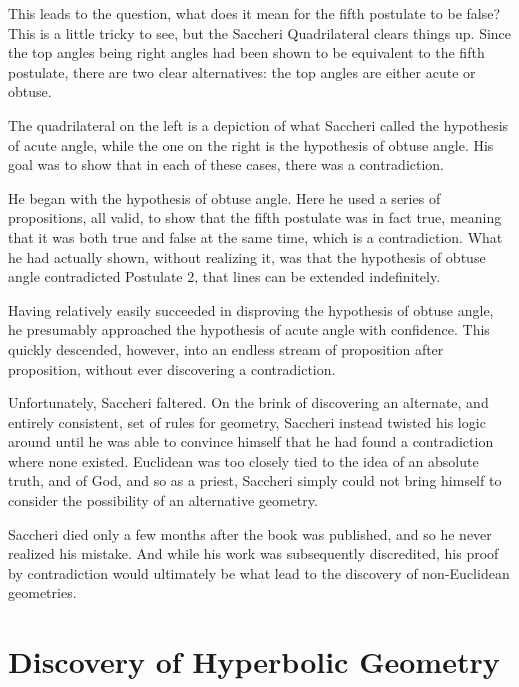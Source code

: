 \documentclass[12pt]{article}
\begin{document}
This leads to the question, what does it mean for the fifth postulate to be false? This is a little tricky to see, but the Saccheri Quadrilateral clears things up. Since the top angles being right angles had been shown to be equivalent to the fifth postulate, there are two clear alternatives: the top angles are either acute or obtuse.

\begin{quads}[scale=.75]
\saccheriquad[type=acute, shift=-4]
\saccheriquad[type=obtuse, shift=4]
\end{quads}

The quadrilateral on the left is a depiction of what Saccheri called the hypothesis of acute angle, while the one on the right is the hypothesis of obtuse angle. His goal was to show that in each of these cases, there was a contradiction.

He began with the hypothesis of obtuse angle. Here he used a series of propositions, all valid, to show that the fifth postulate was in fact true, meaning that it was both true and false at the same time, which is a contradiction. What he had actually shown, without realizing it, was that the hypothesis of obtuse angle contradicted Postulate 2, that lines can be extended indefinitely.

Having relatively easily succeeded in disproving the hypothesis of obtuse angle, he presumably approached the hypothesis of acute angle with confidence. This quickly descended, however, into an endless stream of proposition after proposition, without ever discovering a contradiction.

Unfortunately, Saccheri faltered. On the brink of discovering an alternate, and entirely consistent, set of rules for geometry, Saccheri instead twisted his logic around until he was able to convince himself that he had found a contradiction where none existed. Euclidean was too closely tied to the idea of an absolute truth, and of God, and so as a priest, Saccheri simply could not bring himself to consider the possibility of an alternative geometry.

Saccheri died only a few months after the book was published, and so he never realized his mistake. And while his work was subsequently discredited, his proof by contradiction would ultimately be what lead to the discovery of non-Euclidean geometries.

\section*{Discovery of Hyperbolic Geometry}
\end{document}
